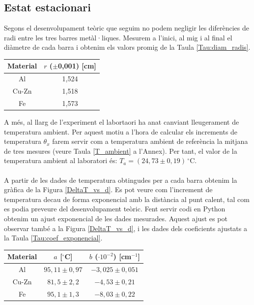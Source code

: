 \documentclass[12pt,twosides,onecolumn,openany]{article}
\newenvironment{Figura}
  {\par\medskip\noindent\minipage{\linewidth}}
  {\endminipage\par\medskip}
\begin{document}
\begin{multicols}{2}
\subsection{Estat estacionari}
Segons el desenvolupament teòric que seguim no podem negligir les diferències de radi entre les tres barres metàl·liques. Mesurem a l'inici, al mig i al final el diàmetre de cada barra i obtenim els valors promig de la Taula \ref{Tau:diam_radis}.
\begin{Figura}
  \centering
  \begin{tabular}{c|c}
    Material & $r$ ($\pm$0,001) [cm] \\
    \hline\hline
    Al & 1,524\\
    Cu-Zn & 1,518\\
    Fe & 1,573 
  \end{tabular}
  \label{Tau:diam_radis}
\end{Figura}
A més, al llarg de l'experiment el labortaori ha anat canviant lleugerament de temperatura ambient. Per aquest motiu a l'hora de calcular els increments de temperatura $\theta_x$ farem servir com a temperatura ambient de referència la mitjana de tres mesures (veure Taula \ref{T_ambient} a l'Annex). Per tant, el valor de la temperatura ambient al laboratori és: \(T_a = (24,73 \pm 0,19)\,^\circ\text{C}\).\\\\

A partir de les dades de temperatura obtingudes per a cada barra obtenim la gràfica de la Figura \ref{DeltaT_vs_d}. Es pot veure com l'increment de temperatura decau de forma exponencial amb la distància al punt calent, tal com es podia preveure del desenvolupament teòric. Fent servir codi en Python obtenim un ajust exponencial de les dades mesurades. Aquest ajust es pot observar també a la Figura \ref{DeltaT_vs_d}, i les dades dels coeficients ajustats a la Taula \ref{Tau:coef_exponencial}.
\begin{Figura}
  \centering
  \begin{tabular}{c|c|c}
    Material & $a$ [$^\circ$C] & $b$ ($\cdot 10^{-2}$) [cm$^{-1}$]\\
    \hline\hline
    Al & $95,11\pm0,97$ & $-3,025\pm0,051$\\
    Cu-Zn & $81,5\pm2,2$ & $-4,53\pm0,21$ \\
    Fe & $95,1\pm1,3$ & $-8,03\pm0,22$
  \end{tabular}
  \label{Tau:coef_exponencial}
\end{Figura}


\end{multicols}
\end{document}
